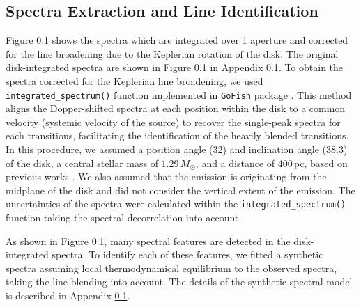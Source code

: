 \documentclass[linenumbers, twocolumn, times]{aastex631}
\begin{document}
\subsection{Spectra Extraction and Line Identification}
Figure \ref{} shows the spectra which are integrated over 1 aperture and corrected for the line broadening due to the Keplerian rotation of the disk. The original disk-integrated spectra are shown in Figure \ref{} in Appendix \ref{}. To obtain the spectra corrected for the Keplerian line broadening, we used \texttt{integrated\_spectrum()} function implemented in \texttt{GoFish} package \citep{GoFish}. This method aligns the Dopper-shifted spectra at each position within the disk to a common velocity (systemic velocity of the source) to recover the single-peak spectra for each transitions, facilitating the identification of the heavily blended transitions. In this procedure, we assumed a position angle (32\arcdeg) and inclination angle (38.3\arcdeg) of the disk, a central stellar mass of $1.29\,M_\odot$, and a distance of 400\,pc, based on previous works \citep{Cieza2016, Tobin2023}. We also assumed that the emission is originating from the midplane of the disk and did not consider the vertical extent of the emission. The uncertainties of the spectra were calculated within the \texttt{integrated\_spectrum()} function taking the spectral decorrelation \citep{Yen2016} into account.

As shown in Figure \ref{}, many spectral features are detected in the disk-integrated spectra. To identify each of these features, we fitted a synthetic spectra assuming local thermodynamical equilibrium to the observed spectra, taking the line blending into account. The details of the synthetic spectral model is described in Appendix \ref{}. 


\end{document}
